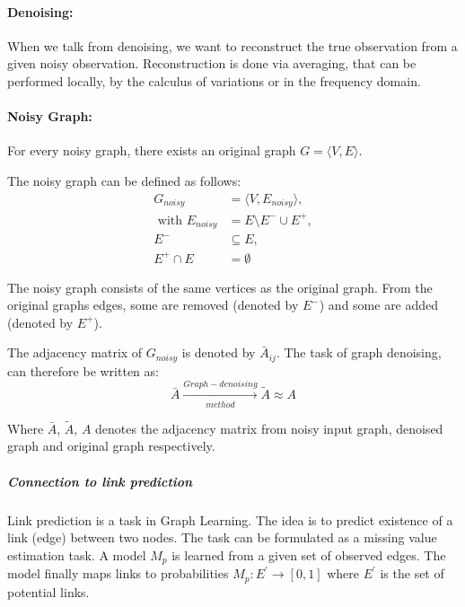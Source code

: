\paragraph{Denoising:}
When we talk from denoising, we want to reconstruct the true observation 
from a given noisy observation. 
Reconstruction is done via averaging, that can be performed
locally, by the calculus of variations or in the frequency domain\cite{noneLocalMean}.

\paragraph{Noisy Graph:}
For every noisy graph, there exists an original graph $G = \langle V,E \rangle$.

The noisy graph can be defined as follows:
\begin{equation}
    \begin{aligned}
        G_{noisy} &= \langle V,E_{noisy} \rangle,  \\ 
        \text{ with }  E_{noisy} &= E \setminus  E^{-} \cup  E^{+}, \\ 
         E^{-} & \subseteq E, \\
         E^{+} \cap E &= \emptyset
    \end{aligned}
\end{equation}

The noisy graph consists of the same vertices as the original graph. From
the original graphs edges, some are removed (denoted by $E^{-}$) and some are added
(denoted by $E^{+}$).

The adjacency matrix of $G_{noisy}$ is denoted by $\bar{A}_{ij}$.
The task of graph denoising, can therefore be written as:
\begin{equation}
    \bar{A} \xrightarrow[method]{Graph-denoising} \tilde{A} \approx A
\end{equation}

Where $\bar{A}$, $\tilde{A}$, $A$ denotes the adjacency matrix from noisy input graph, denoised
 graph and original graph respectively.

\subparagraph{Connection to link prediction}
Link prediction is a task in Graph Learning. 
The idea is to predict existence of a link (edge) between two nodes.
The task can be formulated as a missing value estimation task. A model $M_p$ is learned
from a given set of observed edges. The model finally maps links to probabilities
$M_p : E^{\prime} \rightarrow [0,1]$ where $E^{\prime}$ is the set of potential links.

